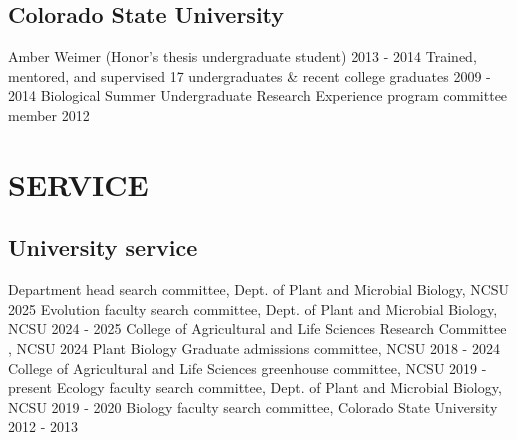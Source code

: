 \documentclass[11pt,english]{article}
\begin{document}
\subsection*{Colorado State University}
Amber Weimer (Honor's thesis undergraduate student)		 \hfill {2013 - 2014} \newline
Trained, mentored, and supervised 17 undergraduates \& recent college graduates		 \hfill {2009 - 2014} \newline
Biological Summer Undergraduate Research Experience program committee member \hfill {2012} 

\vspace{1.5ex}
\section*{SERVICE}
\vspace{-0.5ex}
\subsection*{University service}
Department head search committee, Dept. of Plant and Microbial Biology, NCSU \hfill{2025 }\newline
Evolution faculty search committee, Dept. of Plant and Microbial Biology, NCSU \hfill{2024 - 2025 }\newline
College of Agricultural and Life Sciences Research Committee , NCSU \hfill{2024} \newline
Plant Biology Graduate admissions committee, NCSU \hfill{2018 - 2024} \newline
College of Agricultural and Life Sciences greenhouse committee, NCSU \hfill{2019 - present}\newline
Ecology faculty search committee, Dept. of Plant and Microbial Biology, NCSU \hfill{2019 - 2020 }\newline
Biology faculty search committee, Colorado State University \hfill{2012 - 2013} 
\end{document}
